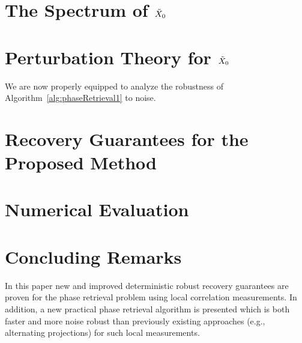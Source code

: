 %

\section{The Spectrum of $\tilde{X}_0$}
\label{sec:Spectrum}


\section{Perturbation Theory for $\tilde{X}_0$}
\label{sec:Perturb}


We are now properly equipped to analyze the robustness of Algorithm~\ref{alg:phaseRetrieval1} to noise.

\section{Recovery Guarantees for the Proposed Method}
\label{sec:RecovGuarantee}


\section{Numerical Evaluation}
\label{sec:NumEval}


\section{Concluding Remarks}
\label{sec:conclusion}

In this paper new and improved deterministic robust recovery guarantees are proven for the phase retrieval problem using local correlation measurements.  In addition, a new practical phase retrieval algorithm is presented which is both faster and more noise robust than previously existing approaches (e.g., alternating projections) for such local measurements.  

